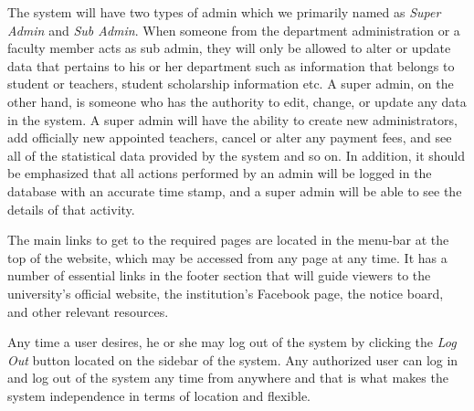 The system will have two types of admin which we primarily named as \textit{Super Admin} and \textit{Sub Admin}. When someone from the department administration or a faculty member acts as sub admin, they will only be allowed to alter or update data that pertains to his or her department such as information that belongs to student or teachers, student scholarship information etc. A super admin, on the other hand, is someone who has the authority to edit, change, or update any data in the system. A super admin will have the ability to create new administrators, add officially new appointed teachers, cancel or alter any payment fees, and see all of the statistical data provided by the system and so on. In addition, it should be emphasized that all actions performed by an admin will be logged in the database with an accurate time stamp, and a super admin will be able to see the details of that activity.

The main links to get to the required pages are located in the menu-bar at the top of the website, which may be accessed from any page at any time. It has a number of essential links in the footer section that will guide viewers to the university's official website, the institution's Facebook page, the notice board, and other relevant resources. 

Any time a user desires, he or she may log out of the system by clicking the \textit{Log Out} button located on the sidebar of the system. Any authorized user can log in and log out of the system any time from anywhere and that is what makes the system independence in terms of location and flexible.

\clearpage